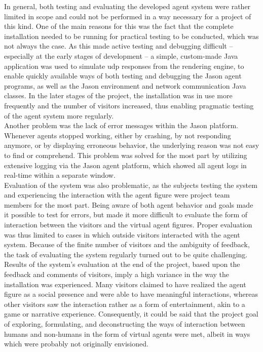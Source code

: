 \documentclass[draft,final]{vutinfth} %
\begin{document}
In general, both testing and evaluating the developed agent system were rather limited in scope and could not be performed in a way necessary for a project of this kind. 
One of the main reasons for this was the fact that the complete installation needed to be running for practical testing to be conducted, which was not always the case. 
As this made active testing and debugging difficult – especially at the early stages of development – a simple, custom-made Java application was used to simulate \gls{udp} responses from the rendering engine, to enable quickly available ways of both testing and debugging the Jason agent programs, as well as the Jason environment and network communication Java classes. 
In the later stages of the project, the installation was in use more frequently and the number of \glspl{visitor} increased, thus enabling pragmatic testing of the agent system more regularly. \\
Another problem was the lack of error messages within the Jason platform. 
Whenever agents stopped working, either by crashing, by not responding anymore, or by displaying erroneous behavior, the underlying reason was not easy to find or comprehend. 
This problem was solved for the most part by utilizing extensive logging via the Jason agent platform, which showed all agent logs in real-time within a separate window. \\
Evaluation of the system was also problematic, as the subjects testing the system and experiencing the interaction with the \gls{agent figure} were project team members for the most part. 
Being aware of both agent behavior and goals made it possible to test for errors, but made it more difficult to evaluate the form of interaction between the \glspl{visitor} and the virtual \glspl{agent figure}. 
Proper evaluation was thus limited to cases in which outside \glspl{visitor} interacted with the agent system. 
Because of the finite number of \glspl{visitor} and the ambiguity of feedback, the task of evaluating the system regularly turned out to be quite challenging. \\
Results of the system’s evaluation at the end of the project, based upon the feedback and comments of \glspl{visitor}, imply a high variance in the way the installation was experienced. 
Many \glspl{visitor} claimed to have realized the \gls{agent figure} as a social presence and were able to have meaningful interactions, whereas other \glspl{visitor} saw the interaction rather as a form of entertainment, akin to a game or narrative experience. 
Consequently, it could be said that the project goal of exploring, formulating, and deconstructing the ways of interaction between humans and non-humans in the form of virtual agents were met, albeit in ways which were probably not originally envisioned.
\end{document}
